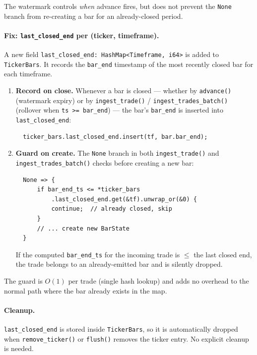 \documentclass[a4paper, 11pt]{article}
\begin{document}
\noindent The watermark controls \emph{when} advance fires, but does not
prevent the \texttt{None} branch from re-creating a bar for an
already-closed period.

\paragraph{Fix: \texttt{last\_closed\_end} per (ticker, timeframe).}
A new field \texttt{last\_closed\_end: HashMap<Timeframe, i64>} is added to
\texttt{TickerBars}.  It records the \texttt{bar\_end} timestamp of the most
recently closed bar for each timeframe.

\begin{enumerate}[nosep]
    \item \textbf{Record on close.}  Whenever a bar is closed --- whether by
          \texttt{advance()} (watermark expiry) or by \texttt{ingest\_trade()}
          / \texttt{ingest\_trades\_batch()} (rollover when
          \texttt{ts >= bar\_end}) --- the bar's \texttt{bar\_end} is inserted
          into \texttt{last\_closed\_end}:
          \begin{verbatim}
  ticker_bars.last_closed_end.insert(tf, bar.bar_end);
          \end{verbatim}

    \item \textbf{Guard on create.}  The \texttt{None} branch in both
          \texttt{ingest\_trade()} and \texttt{ingest\_trades\_batch()} checks
          before creating a new bar:
          \begin{verbatim}
  None => {
      if bar_end_ts <= *ticker_bars
          .last_closed_end.get(&tf).unwrap_or(&0) {
          continue;  // already closed, skip
      }
      // ... create new BarState
  }
          \end{verbatim}
          If the computed \texttt{bar\_end\_ts} for the incoming trade is
          $\leq$ the last closed end, the trade belongs to an already-emitted
          bar and is silently dropped.
\end{enumerate}

\noindent The guard is $O(1)$ per trade (single hash lookup) and adds no
overhead to the normal path where the bar already exists in the map.

\paragraph{Cleanup.}
\texttt{last\_closed\_end} is stored inside \texttt{TickerBars}, so it is
automatically dropped when \texttt{remove\_ticker()} or \texttt{flush()}
removes the ticker entry.  No explicit cleanup is needed.
\end{document}
